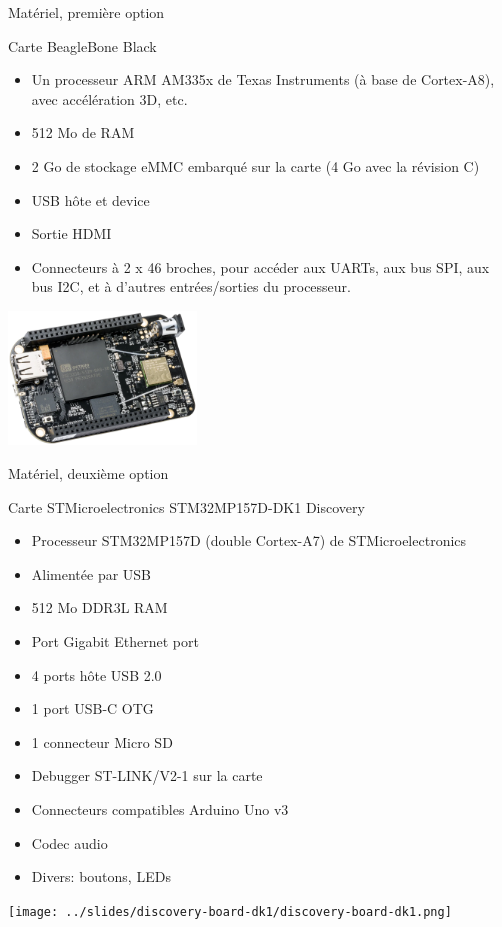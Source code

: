 \documentclass[a4paper,12pt,obeyspaces,spaces,hyphens]{article}
\begin{document}
\feagendatwocolumn
{Matériel, première option}
{
  Carte BeagleBone Black
  \begin{itemize}
  \item Un processeur ARM AM335x de Texas Instruments (à base de
    Cortex-A8), avec accélération 3D, etc.
  \item 512 Mo de RAM
  \item 2 Go de stockage eMMC embarqué sur la carte
	\newline(4 Go avec la révision C)
  \item USB hôte et device
  \item Sortie HDMI
  \item Connecteurs à 2 x 46 broches, pour accéder aux UARTs, aux
        bus SPI, aux bus I2C, et à d'autres entrées/sorties du
        processeur.
  \end{itemize}
}{}
{
  \begin{center}
    \includegraphics[width=5cm]{../slides/beagleboneblack-board/beagleboneblack.png}
  \end{center}
}

\feagendatwocolumn
{Matériel, deuxième option}
{
  Carte STMicroelectronics STM32MP157D-DK1 Discovery
  \begin{itemize}
  \item Processeur STM32MP157D (double Cortex-A7) de STMicroelectronics
  \item Alimentée par USB
  \item 512 Mo DDR3L RAM
  \item Port Gigabit Ethernet port
  \item 4 ports hôte USB 2.0
  \item 1 port USB-C OTG
  \item 1 connecteur Micro SD
  \item Debugger ST-LINK/V2-1 sur la carte
  \item Connecteurs compatibles Arduino Uno v3
  \item Codec audio
  \item Divers: boutons, LEDs
  \end{itemize}
}{}
{
  \begin{center}
    \texttt{[image: ../slides/discovery-board-dk1/discovery-board-dk1.png]}
  \end{center}
}
\end{document}
